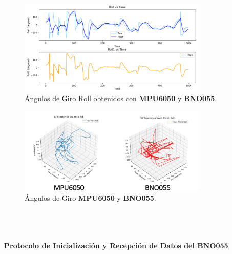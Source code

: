 \begin{figure}[H]
    \centering
    \includegraphics[width=0.8\textwidth]{Imagenes/Metodologia/Angulos_Giro_roll_Mpu6050_BNO055.png}
    \caption{Ángulos de Giro Roll obtenidos con \textbf{MPU6050} y \textbf{BNO055}.}
    \label{fig:roll}
\end{figure}

\begin{figure}[H]
    \centering
    \includegraphics[width=0.8\textwidth]{Imagenes/Metodologia/Angulos_Giro_Mpu6050_BNO055.png}
    \caption{Ángulos de Giro \textbf{MPU6050} y \textbf{BNO055}.}
    \label{fig:3d_trajectory}
\end{figure}

\\ \\
\paragraph{ \large \textbf{Protocolo de Inicialización y Recepción de Datos del BNO055}}

